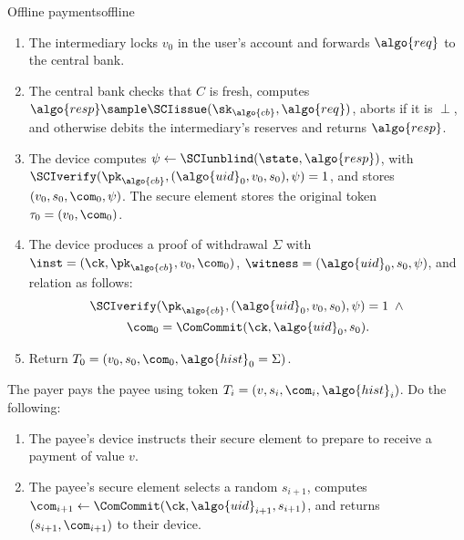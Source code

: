 \begin{protocolbox}{Offline payments}{offline}
\begin{description}
\begin{enumerate}
        \item The intermediary locks $v_0$ in the user's account and forwards
          $\algo{req}$ to the central bank.

        \item The central bank checks that $C$ is fresh, computes $\algo{resp}
          \sample \SCIissue(\sk_{\algo{cb}}, \algo{req})$, aborts if it is
          $\perp$, and otherwise debits the intermediary's reserves and returns
          $\algo{resp}$.

        \item The device computes $\psi \leftarrow \SCIunblind(\state,
          \algo{resp})$, with $\SCIverify(\pk_{\algo{cb}}, (\algo{uid}_0, v_0,
          s_0), \psi) = 1$, and stores $(v_0, s_0, \com_0, \psi)$. The secure
          element stores the original token $\tau_0 = (v_0, \com_0)$.

        \item The device produces a proof of withdrawal $\Sigma$ with $\inst =
          (\ck, \pk_{\algo{cb}}, v_0, \com_0)$, $\witness = (\algo{uid}_0, s_0,
          \psi)$, and relation as follows:
          \begin{gather*}
            \SCIverify(\pk_{\algo{cb}}, (\algo{uid}_0, v_0, s_0), \psi) = 1
            \;\wedge{} \\ \com_0 = \ComCommit(\ck, \algo{uid}_0, s_0).
          \end{gather*}

        \item Return $T_0 = (v_0, s_0, \com_0, \algo{hist}_0 = \Sigma)$.

      \end{enumerate}

    \item[$p_i \sample \OPexecute(T_i)$ :] The payer pays the payee using token
      $T_i = (v, s_i, \com_i, \algo{hist}_i)$. Do the following:

      \begin{enumerate}

        \item The payee's device instructs their secure element to prepare to
          receive a payment of value $v$.

        \item The payee's secure element selects a random $s_{i+1}$, computes
          $\com_{i+1} \leftarrow \ComCommit(\ck, \algo{uid}_{i+1}, s_{i+1})$,
          and returns $(s_{i+1}, \com_{i+1})$ to their device.


\end{enumerate}
\end{description}
\end{protocolbox}
